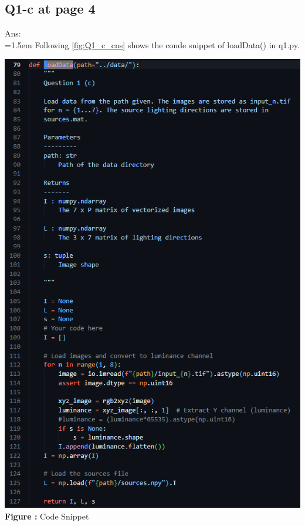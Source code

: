\documentclass{article}
\begin{document}
	\newpage
	\subsection*{Q1-c at page 4}
	Ans:\\
	\hangindent=1.5em \hspace{1.5em}Following \autoref{fig:Q1_c_cns} shows the conde snippet of loadData() in q1.py.
	\newline
	
	\begin{minipage}{1\linewidth}
	\centering
	\includegraphics[width=0.7\linewidth, height=0.95\columnwidth]{./Q1_c_cns.png}
	  \\%
	\textbf{Figure \thefigure:} Code Snippet  %
	\label{fig:Q1_c_cns}         %
	\end{minipage}
	
	\newpage
\end{document}
